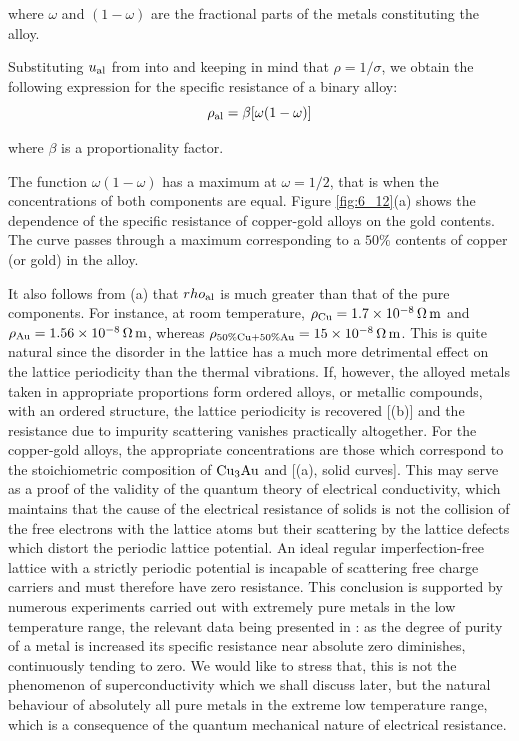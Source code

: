 \noindent
where $\omega$ and $(1-\omega)$ are the fractional parts of the metals constituting the alloy.

Substituting $u_{\text{al}}$ from  into  and keeping in mind that $\rho=1/\sigma$, we obtain the following expression for the specific resistance of a binary alloy:
\begin{equation}\label{eq:6_31}
	\rho_{\text{al}} = \beta [\omega (1-\omega)]
\end{equation}

\noindent
where $\beta$ is a proportionality factor.

The function $\omega (1-\omega)$ has a maximum at $\omega=1/2$, that is when the concentrations of both components are equal. Figure \ref{fig:6_12}(a) shows the dependence of the specific resistance of copper-gold alloys on the gold contents. The curve passes through a maximum corresponding to a $50\%$ contents of copper (or gold) in the alloy.

It also follows from (a) that $rho_{\text{al}}$ is much greater than that of the pure components. For instance, at room temperature, $\rho_{\text{Cu}}=\SI{1.7e-8}{\ohm\metre}$ and $\rho_{\text{Au}}=\SI{1.56e-8}{\ohm\metre}$, whereas $\rho_{\text{$50\%$Cu$+50\%$Au}}=\SI{15e-8}{\ohm\metre}$. This is quite natural since the disorder in the lattice has a much more detrimental effect on the lattice periodicity than the thermal vibrations.
If, however, the alloyed metals taken in appropriate proportions form ordered alloys, or metallic compounds, with an ordered structure, the lattice periodicity is recovered [(b)] and the resistance due to impurity scattering vanishes practically altogether. For the copper-gold alloys, the appropriate concentrations are those which correspond to the stoichiometric composition of $\ce{Cu3Au}$ and  [(a), solid curves]. This may serve as a proof of the validity of the quantum theory of electrical conductivity, which maintains that the cause of the electrical resistance of solids is not the collision of the free electrons with the lattice atoms but their scattering by the lattice defects which distort the periodic lattice potential. An ideal regular imperfection-free lattice with a strictly periodic potential is incapable of scattering free charge carriers and must therefore have zero resistance. This conclusion is supported by numerous experiments carried out with extremely pure metals in the low temperature range, the relevant data being presented in : as the degree of purity of a metal is increased its specific resistance near absolute zero diminishes, continuously tending to zero. We would like to stress that, this is not the phenomenon of superconductivity which we shall discuss later, but the natural behaviour of absolutely all pure metals in the extreme low temperature range, which is a consequence of the quantum mechanical nature of electrical resistance.

